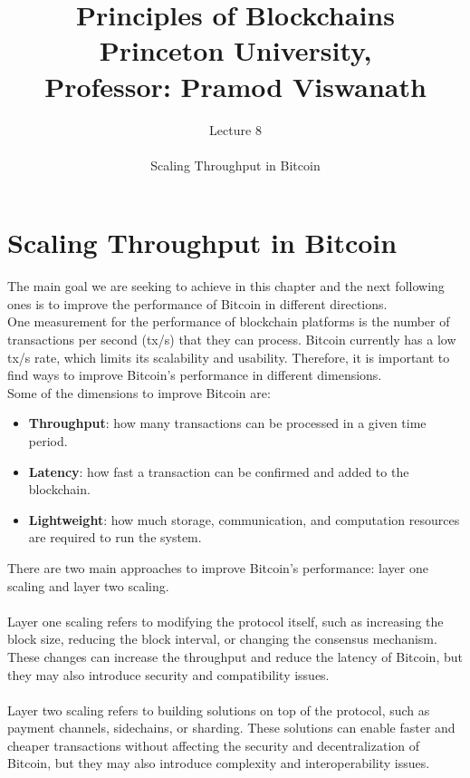 \documentclass{report}
\title{\Huge{Principles of Blockchains \\ Princeton University,\\
		Professor: Pramod Viswanath}}
\author{\huge{Lecture 8} \\\\ Scaling Throughput in Bitcoin}
\begin{document}
\maketitle
\newpage%
\tableofcontents
\pagebreak

\chapter{Scaling Throughput in Bitcoin}
The main goal we are seeking to achieve in this chapter and the next following ones is to improve the performance of Bitcoin in different directions. \\
One measurement for the performance of blockchain platforms is the number of transactions per second (tx/s) that they can process. Bitcoin currently has a low tx/s rate, which limits its scalability and usability. Therefore, it is important to find ways to improve Bitcoin’s performance in different dimensions.\\
Some of the dimensions to improve Bitcoin are:
\begin{itemize}
	\item \textbf{Throughput}: how many transactions can be processed in a given time period.
	\item \textbf{Latency}: how fast a transaction can be confirmed and added to the blockchain.
	\item \textbf{Lightweight}: how much storage, communication, and computation resources are required to run the system.
\end{itemize}
There are two main approaches to improve Bitcoin’s performance: layer one scaling and layer two scaling.\\\\
Layer one scaling refers to modifying the protocol itself, such as increasing the block size, reducing the block interval, or changing the consensus mechanism. These changes can increase the throughput and reduce the latency of Bitcoin, but they may also introduce security and compatibility issues.\\\\
Layer two scaling refers to building solutions on top of the protocol, such as payment channels, sidechains, or sharding. These solutions can enable faster and cheaper transactions without affecting the security and decentralization of Bitcoin, but they may also introduce complexity and interoperability issues.
\end{document}
